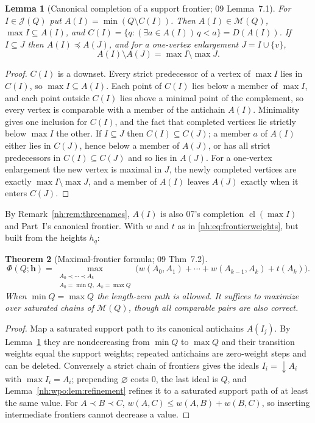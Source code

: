 \documentclass[11pt,a4paper]{article}
\newtheorem{theorem}{Theorem}[section]
\newtheorem{lemma}[theorem]{Lemma}
\theoremstyle{definition}
\theoremstyle{remark}
\newcommand{\M}{\mathcal M}
\newcommand{\J}{\mathcal J}
\newcommand{\mcl}{\operatorname{cl}}
\begin{document}
\begin{lemma}[Canonical completion of a support frontier; 09 Lemma~7.1]
\label{nh:wpo:lem:canonical}
For $I\in\J(Q)$ put $A(I)=\min(Q\setminus C(I))$. Then $A(I)\in\M(Q)$,
$\max I\subseteq A(I)$, and $C(I)=\{q:(\exists a\in A(I))\,q<a\}=D(A(I))$. If
$I\subseteq J$ then $A(I)\preceq A(J)$, and for a one-vertex enlargement
$J=I\cup\{v\}$,
\begin{equation}\label{nh:wpo:eq:canonicalretire}
 A(I)\setminus A(J)=\max I\setminus\max J .
\end{equation}
\end{lemma}
\begin{proof}
$C(I)$ is a downset. Every strict predecessor of a vertex of $\max I$ lies in
$C(I)$, so $\max I\subseteq A(I)$. Each point of $C(I)$ lies below a member of
$\max I$, and each point outside $C(I)$ lies above a minimal point of the
complement, so every vertex is comparable with a member of the antichain $A(I)$.
Minimality gives one inclusion for $C(I)$, and the fact that completed vertices
lie strictly below $\max I$ the other. If $I\subseteq J$ then $C(I)\subseteq
C(J)$; a member $a$ of $A(I)$ either lies in $C(J)$, hence below a member of
$A(J)$, or has all strict predecessors in $C(I)\subseteq C(J)$ and so lies in
$A(J)$. For a one-vertex enlargement the new vertex is maximal in $J$, the newly
completed vertices are exactly $\max I\setminus\max J$, and a member of $A(I)$
leaves $A(J)$ exactly when it enters $C(J)$.
\end{proof}

By Remark~\ref{nh:rem:threenames}, $A(I)$ is also 07's completion
$\mcl(\max I)$ and Part~I's canonical frontier. With $w$ and $t$ as in
\eqref{nh:eq:frontierweights}, but built from the heights $h_q$:

\begin{theorem}[Maximal-frontier formula; 09 Thm~7.2]\label{nh:wpo:thm:compressed}
\begin{equation}\label{nh:wpo:eq:compressed}
 \boxed{\displaystyle
 \Phi(Q;\boldsymbol h)=
 \max_{\substack{A_0\prec\cdots\prec A_k\\ A_0=\min Q,\ A_k=\max Q}}
 \bigl(w(A_0,A_1)+\cdots+w(A_{k-1},A_k)+t(A_k)\bigr).}
\end{equation}
When $\min Q=\max Q$ the length-zero path is allowed. It suffices to maximize
over saturated chains of $\M(Q)$, though all comparable pairs are also correct.
\end{theorem}
\begin{proof}
Map a saturated support path to its canonical antichains $A(I_j)$. By
Lemma~\ref{nh:wpo:lem:canonical} they are nondecreasing from $\min Q$ to $\max Q$
and their transition weights equal the support weights; repeated antichains are
zero-weight steps and can be deleted. Conversely a strict chain of frontiers
gives the ideals $I_i={\downarrow}A_i$ with $\max I_i=A_i$; prepending
$\varnothing$ costs $0$, the last ideal is $Q$, and
Lemma~\ref{nh:wpo:lem:refinement} refines it to a saturated support path of at
least the same value. For $A\prec B\prec C$, $w(A,C)\le w(A,B)+w(B,C)$, so
inserting intermediate frontiers cannot decrease a value.
\end{proof}
\end{document}
